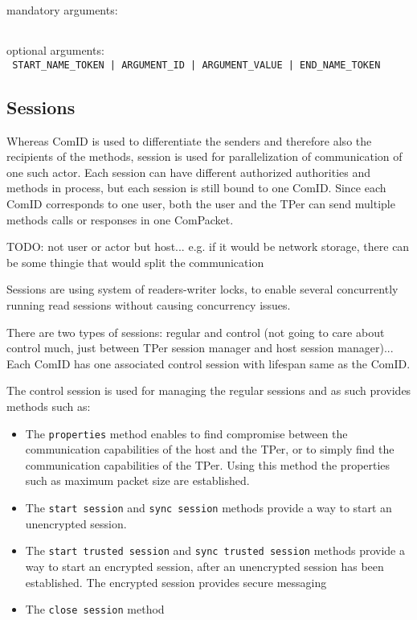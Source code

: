 mandatory arguments: \\
\verb#  #

optional arguments: \\
\verb# START_NAME_TOKEN | ARGUMENT_ID | ARGUMENT_VALUE | END_NAME_TOKEN # 


\subsection{Sessions}

Whereas ComID is used to differentiate the senders and therefore also the recipients of the methods, session is used for parallelization of communication of one such actor. Each session can have different authorized authorities and methods in process, but each session is still bound to one ComID. Since each ComID corresponds to one user, both the user and the TPer can send multiple methods calls or responses in one ComPacket.

TODO: not user or actor but host... e.g.  if it would be network storage, there can be some thingie that would split the communication 

Sessions are using system of readers-writer locks, to enable several concurrently running read sessions without causing concurrency issues.

There are two types of sessions: regular and control (not going to care about control much, just between TPer session manager and host session manager)...
Each ComID has one associated control session with lifespan same as the ComID. 

The control session is used for managing the regular sessions and as such provides methods such as:
\begin{itemize}
\item The \verb|properties| method enables to find compromise between the communication capabilities of the host and the TPer, or to simply find the communication capabilities of the TPer. Using this method the properties such as maximum packet size are established.
\item The \verb|start session| and \verb|sync session| methods provide a way to start an unencrypted session.
\item The \verb|start trusted session| and \verb|sync trusted session| methods provide a way to start an encrypted session, after an unencrypted session has been established. The encrypted session provides secure messaging
\item The \verb|close session| method
\end{itemize}


